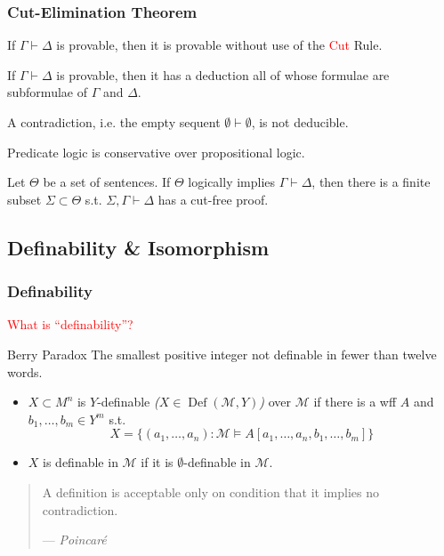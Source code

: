 \documentclass[UTF8,aspectratio=43,11pt,colorlinks,compress,openany]{beamer}%
\begin{document}
\begin{frame}\frametitle{Cut-Elimination Theorem}\vspace{-1ex}
	\begin{theorem}
		If $\Gamma\vdash\Delta$ is provable, then it is
		provable without use of the \textcolor{red}{Cut} Rule.
	\end{theorem}
\setlength\belowdisplayskip{0pt}
	\begin{corollary}
		If $\Gamma\vdash\Delta$ is provable, then it has a deduction all of whose formulae are subformulae of $\Gamma$ and $\Delta$.
	\end{corollary}
	\begin{corollary}[Consistency]
		A contradiction, i.e. the empty sequent $\emptyset\vdash\emptyset$, is not deducible.
	\end{corollary}
	\begin{corollary}[Conservation]
		Predicate logic is conservative over propositional logic.
	\end{corollary}
	\begin{theorem}
		Let $\Theta$ be a set of sentences. If $\Theta$ logically implies $\Gamma\vdash\Delta$, then there is a finite subset $\Sigma\subset\Theta$ s.t. $\Sigma,\Gamma\vdash\Delta$ has a cut-free proof.
	\end{theorem}
\end{frame}

\subsection{Definability \& Isomorphism}

\begin{frame}\frametitle{Definability}
\begin{block}{}
	\begin{center}
		\textcolor{red}{What is ``definability''?}
	\end{center}
\end{block}
\begin{block}{Berry Paradox}
	The smallest positive integer not definable in fewer than twelve words.
\end{block}
\begin{definition}[Definability]
\begin{itemize}
	\item $X\subset M^n$ is $Y$-definable \emph{($X\in\operatorname{Def}(\mathcal{M},Y)$)} over $\mathcal{M}$ if there is a wff $A$ and $b_1,\dots,b_m\in Y^m$ s.t.
	\[X=\big\{(a_1,\dots,a_n): \mathcal{M}\vDash A[a_1,\dots,a_n,b_1,\dots,b_m]\big\}\]
	\item $X$ is definable in $\mathcal{M}$ if it is $\emptyset$-definable in $\mathcal{M}$.
\end{itemize}
\end{definition}
\begin{quote}
	A definition is acceptable only on condition that it implies no contradiction.\par\hfill --- \textsl{Poincar\'e}
\end{quote}
\end{frame}
\end{document}
